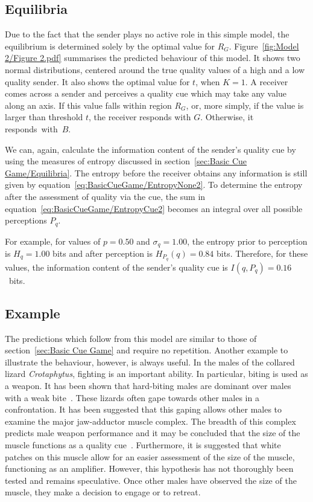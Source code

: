 \documentclass[a4paper,12pt]{article}
\numberwithin{equation}{section}
\begin{document}
\subsection{Equilibria}
\label{sec:CueDetectionModel/Equilibria}

Due to the fact that the sender plays no active role in this simple model, the equilibrium is determined solely by the optimal value for $R_{G}$. Figure~\ref{fig:Model 2/Figure 2.pdf} summarises the predicted behaviour of this model. It shows two normal distributions, centered around the true quality values of a high and a low quality sender. It also shows the optimal value for $t$, when $K=1$. A receiver comes across a sender and perceives a quality cue which may take any value along an axis. If this value falls within region $R_{G}$, or, more simply, if the value is larger than threshold $t$, the receiver responds with $G$. Otherwise, it responds~with~$B$.

We can, again, calculate the information content of the sender's quality cue by using the measures of entropy discussed in section~\ref{sec:Basic Cue Game/Equilibria}. The entropy before the receiver obtains any information is still given by equation~\ref{eq:BasicCueGame/EntropyNone2}. To determine the entropy after the assessment of quality via the cue, the sum in equation~\ref{eq:BasicCueGame/EntropyCue2} becomes an integral over all possible perceptions $P_{q}$.

For example, for values of $p = 0.50$ and $\sigma_{q} = 1.00$, the entropy prior to perception is $H_{q} = 1.00$ bits and after perception is $H_{P_{q}}(q) = 0.84$ bits. Therefore, for these values, the information content of the sender's quality cue is $I(q, P_{q}) = 0.16$~bits.


\subsection{Example}
\label{sec:CueDetectionModel/Example}

The predictions which follow from this model are similar to those of section~\ref{sec:Basic Cue Game} and require no repetition. Another example to illustrate the behaviour, however, is always useful. In the males of the collared lizard \textit{Crotaphytus}, fighting is an important ability. In particular, biting is used as a weapon. It has been shown that hard-biting males are dominant over males with a weak bite~\cite{Husak2006}. These lizards often gape towards other males in a confrontation. It has been suggested that this gaping allows other males to examine the major jaw-adductor muscle complex. The breadth of this complex predicts male weapon performance and it may be concluded that the size of the muscle functions as a quality cue~\cite{Lappin2006}. Furthermore, it is suggested that white patches on this muscle allow for an easier assessment of the size of the muscle, functioning as an amplifier. However, this hypothesis has not thoroughly been tested and remains speculative. Once other males have observed the size of the muscle, they make a decision to engage or to retreat.
\end{document}
